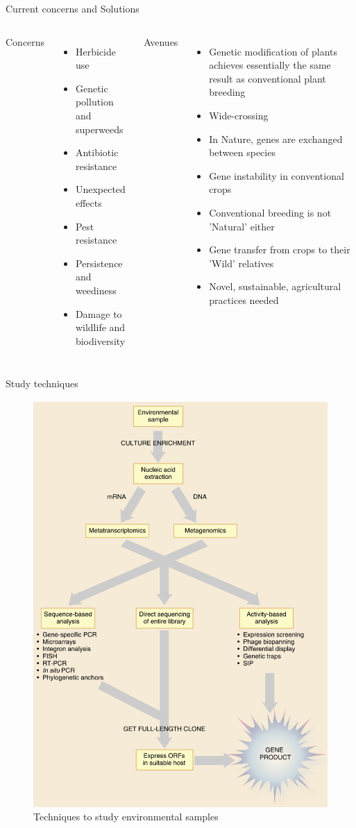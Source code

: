 \documentclass[ignorenonframetext,aspectratio=169]{beamer}
\begin{document}
\begin{frame}{Current concerns and Solutions}
\protect\hypertarget{current-concerns-and-solutions}{}

\begin{columns}[T,onlytextwidth]
  
  \alert {Concerns}
  \begin{itemize}
  \item Herbicide use
  \item Genetic pollution and superweeds
  \item Antibiotic resistance
  \item Unexpected effects
  \item Pest resistance
  \item Persistence and weediness
  \item Damage to wildlife and biodiversity
  \end{itemize}
  
  
  \alert {Avenues}
  \begin{itemize}
  \item Genetic modification of plants achieves essentially the same result as conventional plant breeding
  \item Wide-crossing
  \item In Nature, genes are exchanged between species
  \item Gene instability in conventional crops
  \item Conventional breeding is not 'Natural' either
  \item Gene transfer from crops to their 'Wild' relatives
  \item Novel, sustainable, agricultural practices needed
  
  \end{itemize}
  
\end{columns}

\end{frame}

\begin{frame}{Study techniques}
\protect\hypertarget{study-techniques}{}

\begin{figure}
\includegraphics[width=0.32\linewidth]{../images/environmental_techniques} \caption{Techniques to study environmental samples}\label{fig:environment-samples-study}
\end{figure}

\end{frame}
\end{document}
